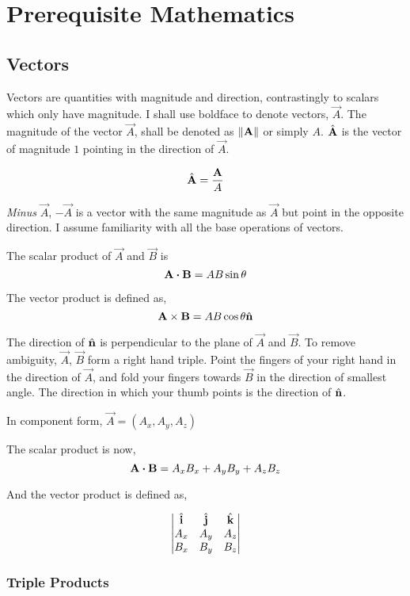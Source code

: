 \chapter{Prerequisite Mathematics}

\section{Vectors}

Vectors are quantities with magnitude and direction, contrastingly to scalars which only have magnitude.
I shall use boldface to denote vectors, \(\vec{A}\). The magnitude of the vector \(\vec{A}\),
shall be denoted as \(\norm{\boldsymbol{\mathbf{A}}}\) or simply \(A\). \({\hat{\boldsymbol{\mathbf{A}}}}\) is 
the vector of magnitude \(1\) pointing in the direction of \(\vec{A}\).

\[
    {\hat{\boldsymbol{\mathbf{A}}}} = \frac{\boldsymbol{\mathbf{A}}}{A}
\]

\emph{Minus} \(\vec{A}\), \(-\vec{A}\) is a vector with the same magnitude as \(\vec{A}\)
but point in the opposite direction. I assume familiarity with all the base operations of 
vectors.  

The scalar product of \(\vec{A}\) and \(\vec{B}\) is
\[
    \vec{A} \dtp \vec{B} = AB \sin \theta
\]

The vector product is defined as,
\[
    \boldsymbol{\mathbf{A}} \times \boldsymbol{\mathbf{B}} = AB \cos \theta {\hat{\boldsymbol{\mathbf{n}}}}
\]

The direction of \({\hat{\boldsymbol{\mathbf{n}}}}\) is perpendicular to the plane of \(\vec{A}\) and \(\vec{B}\). 
To remove ambiguity, \(\vec{A}\), \(\vec{B}\) form a right hand triple. Point the
fingers of your right hand in the direction of \(\vec{A}\), and fold your fingers towards
\(\vec{B}\) in the direction of smallest angle. The direction in which your thumb points
is the direction of \({\hat{\boldsymbol{\mathbf{n}}}}\).

In component form,
\(\vec{A} = (A_x, A_y, A_z)\)

The scalar product is now,
\[
    \vec{A} \dtp \vec{B} = A_xB_x + A_yB_y + A_zB_z
\]

And the vector product is defined as, 

\[
\begin{vmatrix}
    {\hat{\boldsymbol{\mathbf{i}}}} & {\hat{\boldsymbol{\mathbf{j}}}} & {\hat{\boldsymbol{\mathbf{k}}}} \\
    A_x & A_y & A_z \\
    B_x & B_y & B_z
\end{vmatrix}
\]

\subsection{Triple Products}

